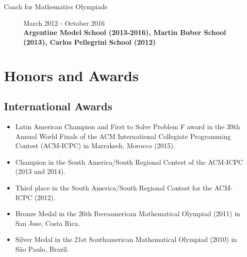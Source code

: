 \documentclass [a4paper, 11pt]{article}
\newcommand{\tabu}{\hspace*{0.7cm}}
\begin{document}
\begin{description}
\item[Coach for Mathematics Olympiads] {\hfill March 2012 - October 2016 \\ 
\textbf{\small Argentine Model School (2013-2016), Martin Buber School (2013), Carlos Pellegrini School (2012)} \\
	}

\end{description}

\section* {Honors and Awards}

\subsection* {International Awards}

\begin{itemize} \itemsep.05cm
	\item[] Latin American Champion and First to Solve Problem F award in the 39th Annual World Finals of the ACM International Collegiate Programming Contest (ACM-ICPC) in Marrakech, Morocco (2015).
	\item[] Champion in the South America/South Regional Contest of the ACM-ICPC (2013 and 2014).
	\item[] Third place in the South America/South Regional Contest for the ACM-ICPC (2012).
	\item[] Bronze Medal in the 26th Iberoamerican Mathematical Olympiad (2011) in San Jose, Costa Rica.
	\item[] Silver Medal in the 21st Southamerican Mathematical Olympiad (2010) in S\~ao Paulo, Brazil. 
\end{itemize}
\end{document}
